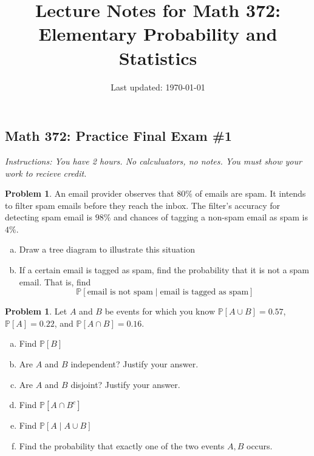 \documentclass[10pt]{article}
\title{Lecture Notes for Math 372: \\Elementary Probability and Statistics}
\date{Last updated: \today}
\theoremstyle{definition}
\newtheorem{problem}[theorem]{Problem}
\newcommand{\1}[1]{\textbf{1}_{\left[#1\right]}} %
\def\P{\mathbb{P}} %
\begin{document}
\begin{center}
  \section*{Math 372: Practice Final Exam \#1}
\end{center}

\textit{Instructions: You have 2 hours. No calculuators, no notes. You must
show your work to recieve credit.}

\vspace{1em}




\begin{problem}%
  An email provider observes that $80\%$ of emails are spam. It intends to filter spam emails before they
  reach the inbox. The filter's accuracy for detecting spam email is $98\%$ and chances of tagging a
  non-spam email as spam is $4\%$.
  \begin{enumerate}[(a)]
    \item Draw a tree diagram to illustrate this situation
    \item If a certain email is tagged as spam, find the probability that it is not a spam email. That
    is, find
    \begin{equation*}
      \P\left[\text{email is not spam}\mid \text{email is tagged as spam} \right]
    \end{equation*}
  \end{enumerate}
\end{problem}



\begin{problem}%
  Let $A$ and $B$ be events for which you know $\P\left[A\cup B \right]=0.57$, $\P\left[A \right]=0.22$,
  and $\P\left[A\cap B \right] = 0.16$.
  \begin{enumerate}[(a)]
    \item Find $\P\left[B \right]$ 
    \item Are $A$ and $B$ independent? Justify your answer.
    \item Are $A$ and $B$ disjoint? Justify your answer.
    \item Find $\P\left[A\cap B^{c} \right]$
    \item Find $\P\left[A\mid A\cup B \right]$
    \item Find the probability that exactly one of the two events $A,B$ occurs.
  \end{enumerate}
\end{problem}
\end{document}
